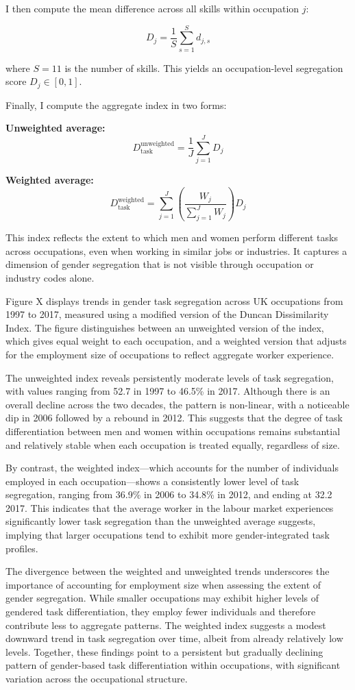 I then compute the mean difference across all skills within occupation $j$:

\[
D_j = \frac{1}{S} \sum_{s=1}^{S} d_{j,s}
\]

where $S = 11$ is the number of skills. This yields an occupation-level segregation score $D_j \in [0, 1]$.

Finally, I compute the aggregate index in two forms:

\textbf{Unweighted average:}
\[
D_{\text{task}}^{\text{unweighted}} = \frac{1}{J} \sum_{j=1}^{J} D_j
\]

\textbf{Weighted average:}
\[
D_{\text{task}}^{\text{weighted}} = \sum_{j=1}^{J} \left( \frac{W_j}{\sum_{j=1}^{J} W_j} \right) D_j
\]

This index reflects the extent to which men and women perform different tasks across occupations, even when working in similar jobs or industries. 
It captures a dimension of gender segregation that is not visible through occupation or industry codes alone.

Figure X displays trends in gender task segregation across UK occupations from 1997 to 2017, measured using a 
modified version of the Duncan Dissimilarity Index. The figure distinguishes between an unweighted version of 
the index, which gives equal weight to each occupation, and a weighted version that adjusts for the employment 
size of occupations to reflect aggregate worker experience.

The unweighted index reveals persistently moderate levels of task segregation, with values ranging from 52.7%
in 1997 to 46.5\% in 2017. Although there is an overall decline across the two decades, the pattern is non-linear, 
with a noticeable dip in 2006 followed by a rebound in 2012. This suggests that the degree of task differentiation 
between men and women within occupations remains substantial and relatively stable when each occupation is treated 
equally, regardless of size.

By contrast, the weighted index—which accounts for the number of individuals employed in each occupation—shows a 
consistently lower level of task segregation, ranging from 36.9\% in 2006 to 34.8\% in 2012, and ending at 32.2%
2017. This indicates that the average worker in the labour market experiences significantly lower task segregation 
than the unweighted average suggests, implying that larger occupations tend to exhibit more gender-integrated task 
profiles.

The divergence between the weighted and unweighted trends underscores the importance of accounting for employment 
size when assessing the extent of gender segregation. While smaller occupations may exhibit higher levels of gendered 
task differentiation, they employ fewer individuals and therefore contribute less to aggregate patterns. The weighted 
index suggests a modest downward trend in task segregation over time, albeit from already relatively low levels. 
Together, these findings point to a persistent but gradually declining pattern of gender-based task differentiation 
within occupations, with significant variation across the occupational structure.

